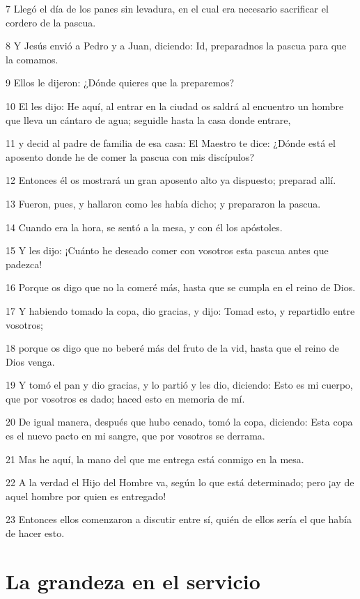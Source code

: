 \par 7 Llegó el día de los panes sin levadura, en el cual era necesario sacrificar el cordero de la pascua.
\par 8 Y Jesús envió a Pedro y a Juan, diciendo: Id, preparadnos la pascua para que la comamos.
\par 9 Ellos le dijeron: ¿Dónde quieres que la preparemos?
\par 10 El les dijo: He aquí, al entrar en la ciudad os saldrá al encuentro un hombre que lleva un cántaro de agua; seguidle hasta la casa donde entrare,
\par 11 y decid al padre de familia de esa casa: El Maestro te dice: ¿Dónde está el aposento donde he de comer la pascua con mis discípulos?
\par 12 Entonces él os mostrará un gran aposento alto ya dispuesto; preparad allí.
\par 13 Fueron, pues, y hallaron como les había dicho; y prepararon la pascua.
\par 14 Cuando era la hora, se sentó a la mesa, y con él los apóstoles.
\par 15 Y les dijo: ¡Cuánto he deseado comer con vosotros esta pascua antes que padezca!
\par 16 Porque os digo que no la comeré más, hasta que se cumpla en el reino de Dios.
\par 17 Y habiendo tomado la copa, dio gracias, y dijo: Tomad esto, y repartidlo entre vosotros;
\par 18 porque os digo que no beberé más del fruto de la vid, hasta que el reino de Dios venga.
\par 19 Y tomó el pan y dio gracias, y lo partió y les dio, diciendo: Esto es mi cuerpo, que por vosotros es dado; haced esto en memoria de mí.
\par 20 De igual manera, después que hubo cenado, tomó la copa, diciendo: Esta copa es el nuevo pacto en mi sangre, que por vosotros se derrama.
\par 21 Mas he aquí, la mano del que me entrega está conmigo en la mesa.
\par 22 A la verdad el Hijo del Hombre va, según lo que está determinado; pero ¡ay de aquel hombre por quien es entregado!
\par 23 Entonces ellos comenzaron a discutir entre sí, quién de ellos sería el que había de hacer esto.

\section*{La grandeza en el servicio}

